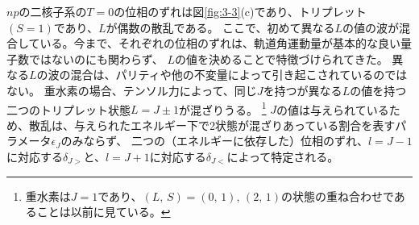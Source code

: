 \documentclass[a4paper,11pt,uplatex]{jsarticle}
\begin{document}
$np$の二核子系の$T=0$の位相のずれは図\ref{fig:3-3}(c)であり、トリプレット$(S=1)$であり、$L$が偶数の散乱である。
ここで、初めて異なる$L$の値の波が混合している。今まで、それぞれの位相のずれは、軌道角運動量が基本的な良い量子数ではないのにも関わらず、
$L$の値を決めることで特徴づけられてきた。
異なる$L$の波の混合は、パリティや他の不変量によって引き起こされているのではない。
重水素の場合、テンソル力によって、同じ$J$を持つが異なる$L$の値を持つ二つのトリプレット状態$L=J\pm 1$が混ざりうる。
\footnote{重水素は$J=1$であり、$(L,\,S)=(0,\,1),\,(2,\,1)$の状態の重ね合わせであることは以前に見ている。}
$J$の値は与えられているため、散乱は、与えられたエネルギー下で2状態が混ざりあっている割合を表すパラメータ$\epsilon_J$のみならず、
二つの（エネルギーに依存した）位相のずれ、$l=J-1$に対応する$\delta_{J>}$と、$l=J+1$に対応する$\delta_{J<}$によって特定される。
\end{document}
